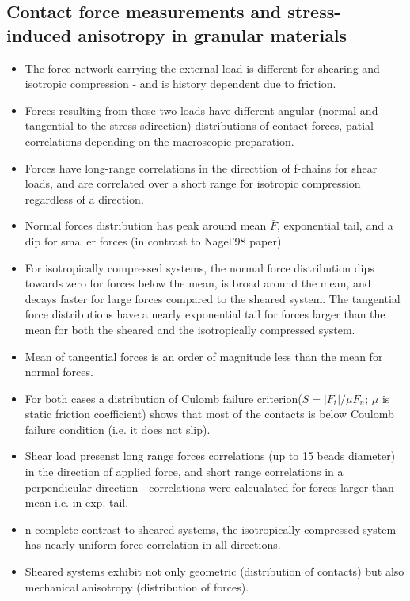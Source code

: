 \documentclass[10pt,a4paper]{article}
\begin{document}
\subsection{Contact force measurements and stress-induced anisotropy in granular materials\cite{bob:05}}
\begin{itemize}
 \item The force network carrying the external load is different for shearing and isotropic compression - and is history dependent due to friction.
 \item Forces resulting from these two loads have different angular (normal and tangential to the stress sdirection) distributions of contact forces,
 patial correlations depending on the macroscopic preparation.
 \item Forces have long-range correlations in the directtion of f-chains for shear loads, and are correlated over a short range for isotropic 
 compression regardless of a direction. 
 \item Normal forces distribution has peak around mean $\bar{F}$, exponential tail, and a dip for smaller forces (in contrast to Nagel'98 paper).
 \item For isotropically compressed systems, the normal force distribution dips towards zero for forces below the mean, 
 is broad around the mean, and decays  faster for large forces compared to the sheared system. 
 The tangential force distributions have a nearly exponential tail for forces larger than the mean 
 for both the sheared and the isotropically compressed system.
 \item Mean of tangential forces is an order of magnitude less than the mean for normal forces. 
 \item For both cases a distribution of Culomb failure criterion($S = |F_t|/\mu F_n$; $\mu$ is static friction coefficient)
 shows that most of the contacts is below Coulomb failure condition (i.e. it does not slip).
 \item Shear load presenst long range forces correlations  (up to 15 beads diameter) in the direction of applied force,
 and short range correlations in a perpendicular direction - correlations were calcualated for forces larger than mean i.e. in exp. tail.
 \item n complete contrast to sheared systems, the isotropically compressed system has nearly uniform force correlation in all directions.
 \item Sheared systems exhibit not only geometric (distribution of contacts) but also mechanical anisotropy (distribution of forces).
\end{itemize}
\end{document}
